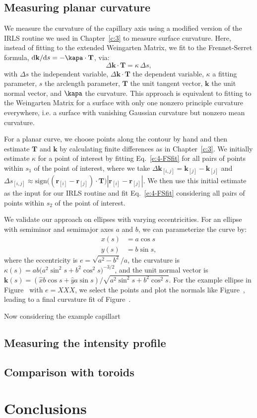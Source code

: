 \subsection{Measuring planar curvature}
We measure the curvature of the capillary axis using a modified version of the IRLS routine we used in Chapter~\ref{c:3} to measure surface curvature.
Here, instead of fitting to the extended Weingarten Matrix, we fit to the Frennet-Serret formula, $\textrm{d}\mathbf{k}/\textrm{d}s = -\kapa \cdot \mathbf{T}$, via:
\begin{equation}
  \Delta \mathbf{k} \cdot \mathbf{T} = \kappa \, \Delta s,\label{e:4-FSfit}
\end{equation}
with $\Delta s$ the independent variable, $\Delta \mathbf{k} \cdot \mathbf{T}$ the dependent variable, $\kappa$ a fitting parameter, $s$ the arclength parameter, $\mathbf{T}$ the unit tangent vector, $\mathbf{k}$ the unit normal vector, and $\kapa$ the curvature.
This approach is equivalent to fitting to the Weingarten Matrix for a surface with only one nonzero principle curvature everywhere, i.e. a surface with vanishing Gaussian curvature but nonzero mean curvature.

For a planar curve, we choose points along the contour by hand and then estimate $\mathbf{T}$ and $\mathbf{k}$ by calculating finite differences as in Chapter~\ref{c:3}.
We initially estimate $\kappa$ for a point of interest by fitting Eq.~\ref{e:4-FSfit} for all pairs of points within $s_1$ of the point of interest, where we take $\Delta \mathbf{k}_{[i,j]} = \mathbf{k}_{[j]} - \mathbf{k}_{[j]}$ and $\Delta s_{[i,j]} \approx \textrm{sign}\big ( (\mathbf{r}_{[i]} - \mathbf{r}_{[j]}) \cdot \mathbf{T}\big ) |\mathbf{r}_{[i]} - \mathbf{r}_{[j]}|$.
We then use this initial estimate as the input for our IRLS routine and fit Eq.~\ref{e:4-FSfit} considering all pairs of points within $s_2$ of the point of interest.

We validate our approach on ellipses with varying eccentricities.
For an ellipse with semiminor and semimajor axes $a$ and $b$, we can parameterize the curve by:
\label{e:4-ellipseParam}
\begin{align}
  x(s) &= a \cos s\tag{\theequation a} \\
  y(s) &= b \sin s\tag{\theequation b},
\end{align}
where the eccentricity is $e = \sqrt{a^2-b^2}/a$, the curvature is $\kappa(s) = a b \big (a^2 \sin^2 s + b^2 \cos^2 s  \big )^{-3/2}$, and the unit normal vector is $\mathbf{k}(s) = (\hat{x} b \cos s + \hat{y} a \sin s)/\sqrt{a^2 \sin^2 s + b^2 \cos^2 s}$.
For the example ellipse in Figure~ with $e = XXX$, we select the points and plot the normals like Figure~, leading to a final curvature fit of Figure~.

Now considering the example capillart
\subsection{Measuring the intensity profile}
\subsection{Comparison with toroids}

\section{Conclusions}
